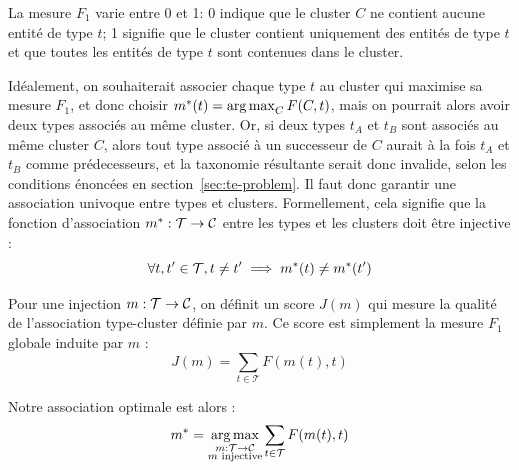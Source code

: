 La mesure $F_1$ varie entre 0 et 1: 0 indique que le cluster $C$ ne contient aucune entité de type $t$; 1 signifie que le cluster contient uniquement des entités de type $t$ et que toutes les entités de type $t$ sont contenues dans le cluster. 


Idéalement, on souhaiterait associer chaque type $t$ au cluster qui maximise sa mesure $F_1$, et donc choisir $m^*(t) = \operatorname*{arg\,max}_C F(C, t)$, mais on pourrait alors avoir deux types associés au même cluster. Or, si deux types $t_A$ et $t_B$ sont associés au même cluster $C$, alors tout type associé à un successeur de $C$ aurait à la fois $t_A$ et $t_B$ comme prédecesseurs, et la taxonomie résultante serait donc invalide, selon les conditions énoncées en section~\ref{sec:te-problem}. Il faut donc garantir une association univoque entre types et clusters. Formellement, cela signifie que la fonction d'association $m^* : \mathcal{T} \rightarrow \mathcal{C}$ entre les types et les clusters doit être injective :
\begin{equation}
    \forall t, t' \in \mathcal{T}, t \neq t' \implies m^*(t) \neq m^*(t')
\end{equation}


Pour une injection $m : \mathcal{T} \rightarrow \mathcal{C}$, on définit un score $J(m)$ qui mesure la qualité de l'association type-cluster définie par $m$. Ce score est simplement la mesure $F_1$ globale induite par $m$ :
\begin{equation}
    J(m) = \sum_{t \in \mathcal{T}} F(m(t), t)
\end{equation}

Notre association optimale est alors :
\begin{equation}
    m^* = \operatorname*{arg\,max}_{
\substack{m : \mathcal{T} \rightarrow \mathcal{C} \\ m\text{ injective}}} \sum_{t \in \mathcal{T}} F(m(t), t)
\label{eq:optim-mapping}
\end{equation}


